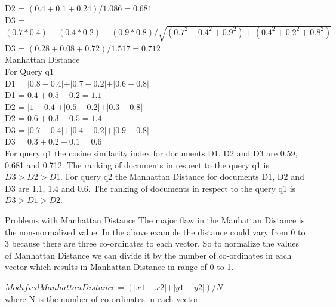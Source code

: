 \documentclass[12pt]{report}
\begin{document}
D2 = $ (0.4 + 0.1 + 0.24)/1.086  = 0.681$\\ 
D3 = $(0.7*0.4 )+ (0.4*0.2) + (0.9*0.8)/ \sqrt{(0.7^2 + 0.4^2 + 0.9^2) + (0.4^2 + 0.2^2 + 0.8^2)}$\\
D3 = $ (0.28 + 0.08 + 0.72)/1.517  = 0.712$\\ 
Manhattan Distance\\
For Query q1\\
D1 = $\lvert 0.8 - 0.4 \lvert + \lvert 0.7 - 0.2\lvert + \lvert 0.6- 0.8\lvert $\\
D1 = $ 0.4 + 0.5 + 0.2 = 1.1$\\ 
D2 = $\lvert 1 - 0.4 \lvert + \lvert 0.5 - 0.2\lvert + \lvert 0.3- 0.8\lvert $\\
D2 = $ 0.6 + 0.3 + 0.5 = 1.4$\\
D3 = $\lvert 0.7 - 0.4 \lvert + \lvert 0.4 - 0.2\lvert + \lvert 0.9- 0.8\lvert $\\
D3 = $ 0.3 + 0.2 + 0.1= 0.6$ \\


For query q1 the cosine similarity index for documents D1, D2 and D3 are 0.59, 0.681 and 0.712. The ranking of documents in respect to the query q1 is $D3 > D2 > D1$. For query q2 the Manhattan Distance for documents D1, D2 and D3 are 1.1, 1.4 and 0.6. The ranking of documents in respect to the query q1 is $D3 > D1> D2$.

Problems with Manhattan Distance
The major flaw in the Manhattan Distance is the non-normalized value. In the above example the distance could vary from 0 to 3 because there are three co-ordinates to each vector. So to normalize the values of Manhattan Distance we can divide it by the number of co-ordinates in each vector which results in Manhattan Distance in range of 0 to 1.

$Modified Manhattan Distance = (\lvert x1 - x2  \lvert  +  \lvert y1 - y2  \lvert)/ N $  \\
where N is the number of co-ordinates in each vector   
\end{document}
